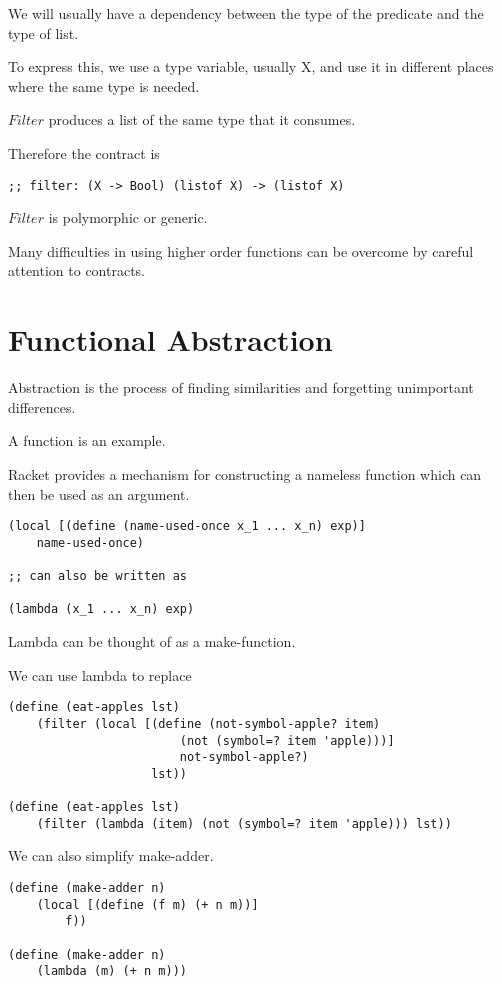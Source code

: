 \documentclass{article}
\begin{document}
We will usually have a dependency between the type of the predicate and the type of list. 

To express this, we use a type variable, usually X, and use it in different places where the same type is needed. 

$Filter$ produces a list of the same type that it consumes. 

Therefore the contract is
\begin{lstlisting}
;; filter: (X -> Bool) (listof X) -> (listof X)
\end{lstlisting}

$Filter$ is polymorphic or generic. 

Many difficulties in using higher order functions can be overcome by careful attention to contracts. 

\section{Functional Abstraction}

Abstraction is the process of finding similarities and forgetting unimportant differences. 

A function is an example. 

Racket provides a mechanism for constructing a nameless function which can then be used as an argument. 

\begin{lstlisting}
(local [(define (name-used-once x_1 ... x_n) exp)]
    name-used-once)

;; can also be written as

(lambda (x_1 ... x_n) exp)
\end{lstlisting}

Lambda can be thought of as a make-function. 

We can use lambda to replace

\begin{lstlisting}
(define (eat-apples lst)
    (filter (local [(define (not-symbol-apple? item)
                        (not (symbol=? item 'apple)))]
                        not-symbol-apple?)
                    lst))

(define (eat-apples lst)
    (filter (lambda (item) (not (symbol=? item 'apple))) lst))
\end{lstlisting}

We can also simplify make-adder. 

\begin{lstlisting}
(define (make-adder n)
    (local [(define (f m) (+ n m))]
        f))

(define (make-adder n)
    (lambda (m) (+ n m)))
\end{lstlisting}
\end{document}
